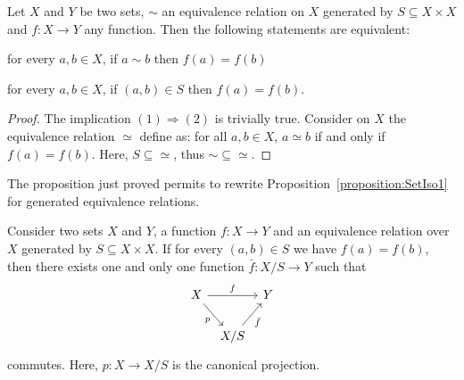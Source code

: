 \begin{proposition}
Let \(X\) and \(Y\) be two sets, \(\sim\) an equivalence relation on \(X\) generated by \(S \subseteq X \times X\) and \(f : X \to Y\) any function. Then the following statements are equivalent:
%
\begin{tcbenum}
\item for every \(a, b \in X\), if \(a \sim b\) then \(f(a) = f(b)\)
\item for every \(a, b \in X\), if \((a, b) \in S\) then \(f(a) = f(b)\).
\end{tcbenum}
\end{proposition}

\begin{proof}
The implication \((1) \Rightarrow (2)\) is trivially true. Consider on \(X\) the equivalence relation \(\simeq\) define as: for all \(a, b \in X\), \(a \simeq b\) if and only if \(f(a) = f(b)\). Here, \(S \subseteq \simeq\), thus \(\sim \subseteq \simeq\).
\end{proof}

The proposition just proved permits to rewrite Proposition~\ref{proposition:SetIso1} for generated equivalence relations.

\begin{corollary}\label{corollary:SetIsoGenEqRel}
Consider two sets \(X\) and \(Y\), a function \(f : X \to Y\) and an equivalence relation over \(X\) generated by \(S \subseteq X \times X\). If for every \((a, b) \in S\) we have \(f(a) = f(b)\), then there exists one and only one function \(\bar f : {X}{/}{S} \to Y\) such that
\[\begin{tikzcd}[column sep=tiny]
X \ar["f", rr] \ar["p", swap, dr] & & Y \\
& {X}{/}{S} \ar["{\bar f}", swap, ur]
\end{tikzcd}\]
commutes. Here, \(p : X \to {X}{/}{S}\) is the canonical projection.
\end{corollary}